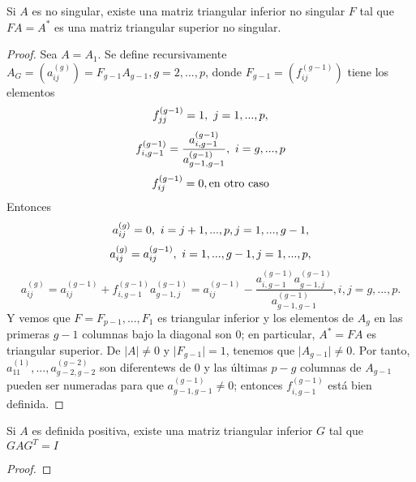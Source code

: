 \begin{teorema}\label{teo2}
Si $A$ es no singular, existe una matriz triangular inferior no singular $F$ tal que $FA=A^*$ es una matriz triangular superior no singular.
\end{teorema}
\begin{proof}
Sea $A=A_1$. Se define recursivamente $A_G=(a_{ij}^{(g)})=F_{g-1}A_{g-1},g=2,...,p$, donde $F_{g-1}=(f_{ij}^{(g-1)})$ tiene los elementos
\[ f_{jj}^{(g-1)}=1,\textnormal{   } j=1,...,p, \]
\[ f_{i,g-1}^{(g-1)} = \frac{a_{i,g-1}^{(g-1)} }{a_{g-1,g-1}^{(g-1)}}, \textnormal{   } i=g,...,p \]
\[ f_{ij}^{(g-1)}=0, \textnormal{en otro caso} \]
Entonces
\[ a_{ij}^{(g)}=0, \textnormal{     } i=j+1,...,p, j=1,...,g-1, \]
\[ a_{ij}^{(g)}=a_{ij}^{(g-1)}, \textnormal{     } i=1,...,g-1, j=1,...,p, \]
\[ a_{ij}^{(g)}=a_{ij}^{(g-1)} + f_{i,g-1}^{(g-1)} a_{g-1,j}^{(g-1)}=a_{ij}^{(g-1)} - \frac{a_{i,g-1}^{(g-1)} a_{g-1,j}^{(g-1)}}{a_{g-1,g-1}^{(g-1)}}, i,j=g,...,p. \]
Y vemos que $F=F_{p-1},...,F_1$ es triangular inferior y los elementos de $A_g$ en las primeras $g-1$ columnas bajo la diagonal son $0$; en particular, $A^*=FA$ es triangular superior. De $\vert A \vert \neq 0$ y $\vert F_{g-1} \vert=1$, tenemos que $\vert A_{g-1} \vert \neq 0$. Por tanto, $a_{11}^{(1)},...,a_{g-2,g-2}^{(g-2)}$ son diferentews de $0$ y las últimas $p-g$ columnas de $A_{g-1}$ pueden ser numeradas para que $a_{g-1,g-1}^{(g-1)} \neq 0$; entonces $f_{i,g-1}^{(g-1)}$ está bien definida.
\end{proof}



\begin{corolario}
Si $A$ es definida positiva, existe una matriz triangular inferior $G$ tal que $GAG^T=I$
\end{corolario}
\begin{proof}

\end{proof}
